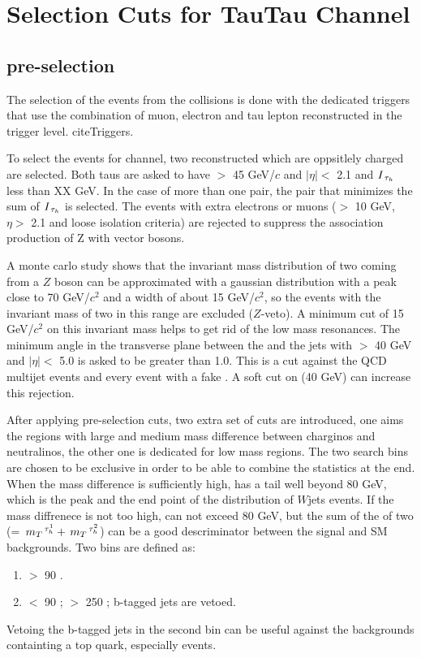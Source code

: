 \section{Selection Cuts for TauTau Channel}
\label{sect:tauTauCuts}
\subsection{pre-selection}
The selection of the events from the collisions is done with the dedicated triggers that use the combination of muon, electron 
and tau lepton reconstructed in the trigger level. cite{Triggers}.

To select the events for \Tau\Tau channel, two reconstructed \Tau which are oppsitlely charged are selected. Both taus are asked to 
have \PT $>$ 45 GeV/$c$ and $|\eta| <$ 2.1 and $I_{\,\tau_{h}}$ less than XX GeV. In the case of more than one pair, the pair that minimizes the sum of
$I_{\,\tau_{h}}$ is selected.
The events with extra electrons or muons (\PT $>$ 10 GeV, $\eta >$ 2.1 and loose isolation criteria) 
are rejected to suppress the association production of Z with vector bosons.

A monte carlo study shows that the invariant mass distribution of two \Tau coming from a $Z$ boson can be approximated with a gaussian 
distribution with a peak close to 70 GeV/$c^2$ and a width of about 15 GeV/$c^2$, so the events with the invariant mass of  
two \Tau in this range are excluded ($Z$-veto). A minimum cut of 15 GeV/$c^2$ on this invariant mass helps to get rid of the low mass
resonances. The minimum angle in the transverse plane between the \MET and the jets with \PT $>$ 40 GeV and $|\eta| <$ 5.0 
is asked to be greater than 1.0. This is a cut against the QCD multijet events and every event with a fake \MET. A soft cut on 
\mttwo (40 GeV) can increase this rejection.

After applying pre-selection cuts, two extra set of cuts are introduced, one aims the regions with large and medium mass difference between 
charginos and neutralinos, the other one is dedicated for low mass regions. The two search bins are chosen to be exclusive in order 
to be able to combine the statistics at the end. When the mass difference is sufficiently high, \mttwo has a tail well beyond 80 GeV, which is 
the peak  and the end point of the \mt distribution of $W$jets events. If the mass diffrenece is not too high, \mttwo can not exceed 80 GeV, 
but the sum of the \mt of two \Tau (\SumMT = $\,{m_T}^{\,\tau_{h}^1} + \,{m_T}^{\,\tau_{h}^2}$) can be a good descriminator between the signal and SM backgrounds. 
Two bins are defined as:
\begin{enumerate}
\item \mttwo $>$ 90 \GeV.
\item \mttwo $<$ 90 \GeV; \SumMT $>$ 250 \GeV; b-tagged jets are vetoed.
\end{enumerate}
Vetoing the b-tagged jets in the second bin can be useful against the backgrounds containting a top quark, especially \ttbar events. 

